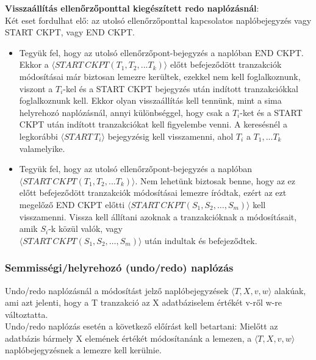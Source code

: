 \documentclass[12pt,margin=0px]{article}
\begin{document}
	\noindent \textbf{Visszaállítás ellenőrzőponttal kiegészített redo naplózásnál}:\\
	Két eset fordulhat elő: az utolsó ellenőrzőponttal kapcsolatos naplóbejegyzés vagy START CKPT, vagy END CKPT.
	
	\begin{itemize}
		\item	Tegyük fel, hogy az utolsó ellenőrzőpont-bejegyzés a naplóban END CKPT.\\
        Ekkor a	$\langle START \ CKPT(T_{1},T_{2},...T_{k}) \rangle$ előtt befejeződött tranzakciók módosításai már biztosan lemezre kerültek, ezekkel nem kell foglalkoznunk, viszont
		a $T_{i}$-kel és a START CKPT bejegyzés után indított tranzakciókkal foglalkoznunk kell. Ekkor olyan visszaállítás kell tennünk,
		mint a sima helyrehozó naplózásnál, annyi különbséggel, hogy csak a $T_{i}$-ket és a START CKPT után indított tranzakciókat
		kell figyelembe venni. A keresésnél a legkorábbi $\langle START \ T_{i}\rangle$ bejegyzésig kell visszamenni, ahol $T_{i}$ a
		$T_{1},...T_{k}$ valamelyike.
		
		\item	Tegyük fel, hogy az utolsó ellenőrzőpont-bejegyzés a naplóban \\
        $\langle START \ CKPT(T_{1},T_{2},...T_{k}) \rangle$. Nem lehetünk biztosak benne, hogy az ez előtt befejeződött tranzakciók módosításai lemezre íródtak, ezért az ezt megelőző
		END CKPT előtti $\langle START \ CKPT(S_{1},S_{2},\ldots,S_{m}) \rangle$ kell visszamenni. Vissza kell állítani azoknak a
		tranzakcióknak a módosításait, amik $S_{i}$-k közül valók, vagy \\
        $\langle START \ CKPT(S_{1},S_{2},\ldots,S_{m}) \rangle$ után indultak és befejeződtek.
	\end{itemize}
	
	\subsubsection*{Semmisségi/helyrehozó (undo/redo) naplózás}
	
	\noindent Undo/redo naplózásnál a módosítást jelző naplóbejegyzések $\langle T,X,v,w \rangle$ alakúak, ami azt jelenti, hogy a T tranzakció
	az X adatbáziselem értékét v-ről w-re változtatta.\\
	
	\noindent Undo/redo naplózás esetén a következő előírást kell betartani: Mielőtt az adatbázis bármely X elemének értékét módosítanánk a lemezen,
	a $\langle T,X,v,w \rangle$ naplóbejegyzésnek a lemezre kell kerülnie.\\
	
\end{document}
